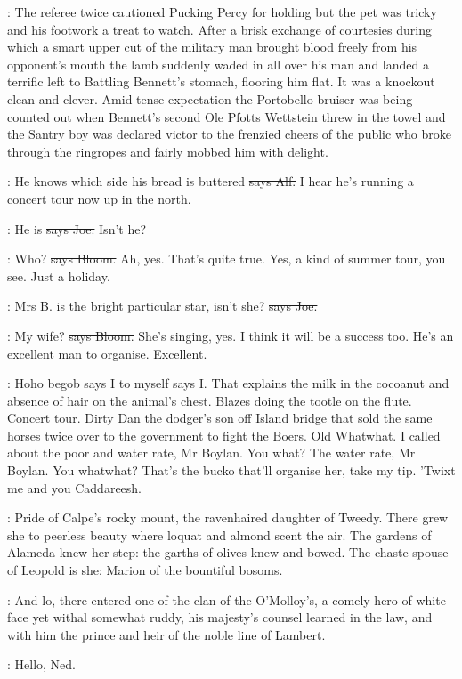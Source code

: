 :
The referee twice cautioned Pucking Percy for holding but the pet was tricky
and his footwork a treat to watch.
After a brisk exchange of courtesies
during which a smart upper cut of the military man
brought blood freely
from his opponent's mouth the lamb suddenly waded in all over his man and
landed a terrific left to Battling Bennett's stomach,
flooring him flat.
It was a knockout clean and clever.
Amid tense expectation the Portobello
bruiser was being counted out when Bennett's second Ole Pfotts Wettstein
threw in the towel and the Santry boy was declared victor to the frenzied
cheers of the public who broke through the ringropes and fairly mobbed him
with delight.

\bergan:
He knows which side his bread is buttered
\sout{says Alf.}
I hear he's running
a concert tour now up in the north.

\joe:
He is
\sout{says Joe.}
Isn't he?

\Bloom:
Who?
\sout{says Bloom.}
Ah,
yes.
That's quite true.
Yes,
a kind of summer tour,
you see.
Just a holiday.

\joe:
Mrs B.
is the bright particular star,
isn't she?
\sout{says Joe.}

\Bloom:
My wife?
\sout{says Bloom.} She's singing,
yes.
I think it will be a success too.
He's an excellent man to organise.
Excellent.

\Nq:
Hoho begob says I to myself says I.
That explains the milk in the cocoanut
and absence of hair on the animal's chest.
Blazes doing the tootle on the
flute.
Concert tour.
Dirty Dan the dodger's son off Island bridge that
sold the same horses twice over to the government to fight the Boers.
Old
Whatwhat.
I called about the poor and water rate,
Mr Boylan.
You what?
The water rate,
Mr Boylan.
You whatwhat?
That's the bucko that'll
organise her,
take my tip.
'Twixt me and you Caddareesh.

:
Pride of Calpe's rocky mount,
the ravenhaired daughter of Tweedy.
There grew she to peerless beauty where loquat and almond scent the air.
The gardens of Alameda knew her step:
the garths of olives knew and
bowed.
The chaste spouse of Leopold is she:
Marion of the bountiful
bosoms.

:
And lo,
there entered one of the clan of the O'Molloy's,
a comely hero
of white face yet withal somewhat ruddy,
his majesty's counsel learned in
the law,
and with him the prince and heir of the noble line of Lambert.

\bergan:
Hello,
Ned.


